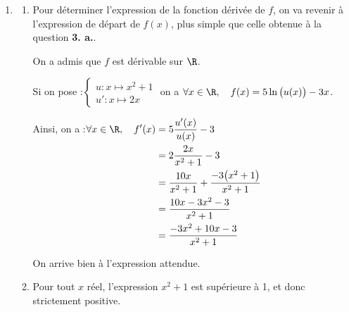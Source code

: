 \begin{enumerate}
\begin{enumerate}
\begin{itemize}
De plus \quad $\lim\limits_{x \to +\infty } x = +\infty $ \quad donc par produit, \quad $\lim\limits_{x \to +\infty } x\left(10 \dfrac{\ln x}{x}- 3\right) = -\infty$.

			\item D'autre part :
\quad
$ \begin{cases} \lim\limits_{x \to +\infty } 1 + \dfrac{1}{x^2} = 1 \\
\lim\limits_{X \to 1} \ln(X) = 0 \end{cases} $ \quad par composition, \quad $ \lim\limits_{x \to +\infty} \ln \left(1+\dfrac{1}{x^{2}}\right) = 0$

Par produit on a donc $ \lim\limits_{x \to +\infty} 5 \ln \left(1+\dfrac{1}{x^{2}}\right) = 0$.
		\end{itemize}

		Finalement, par somme,\quad $\lim\limits_{x \to +\infty} f(x) = -\infty$.
\end{enumerate}
\item
	\begin{enumerate}
		\item Pour déterminer l'expression de la fonction dérivée de $f$, on va revenir à l'expression de départ de $f(x)$, plus simple que celle obtenue à la question \textbf{3. a.}.

On a admis que $f$ est dérivable sur $\R$.

Si on pose :\quad $\begin{cases}u : x \longmapsto x^2 + 1\\ u' : x \longmapsto 2x \end{cases}$ \quad on a \quad $\forall x \in \R,\quad f(x) = 5\ln\big(u(x)\big) - 3x$.

Ainsi, on a :\quad $\forall x \in \R,\quad \begin{aligned}[t]
	f'(x) &= 5\dfrac{u'(x)}{u(x)}-3\\
	&=2\dfrac{2x}{x^2 + 1} - 3\\
	&=\dfrac{10x}{x^2 + 1} + \dfrac{-3\big(x^2 + 1\big)}{x^2 + 1}\\
	&=\dfrac{10x -3x^2 - 3}{x^2 + 1}\\
	&=\dfrac{-3x^2 + 10x - 3}{x^2 + 1}\\
\end{aligned}$

On arrive bien à l'expression attendue.

\item Pour tout $x$ réel, l'expression \quad $x^2 + 1$ \quad est supérieure à 1, et donc strictement positive.


\end{enumerate}
\end{enumerate}

